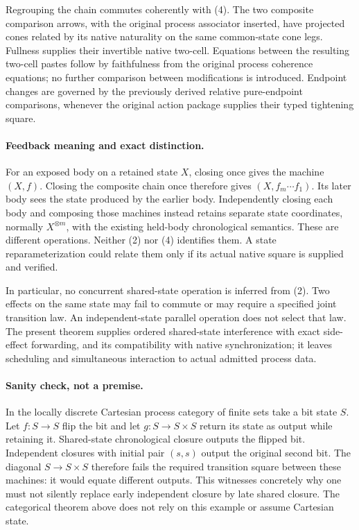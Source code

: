 \documentclass{article}
\begin{document}
Regrouping the chain commutes coherently with (4). The two composite comparison arrows, with the original process associator inserted, have projected cones related by its native naturality on the same common-state cone legs. Fullness supplies their invertible native two-cell. Equations between the resulting two-cell pastes follow by faithfulness from the original process coherence equations; no further comparison between modifications is introduced. Endpoint changes are governed by the previously derived relative pure-endpoint comparisons, whenever the original action package supplies their typed tightening square.

\paragraph{Feedback meaning and exact distinction.} For an exposed body on a retained state $X$, closing once gives the machine $(X,f)$. Closing the composite chain once therefore gives $(X,f_m\cdots f_1)$. Its later body sees the state produced by the earlier body. Independently closing each body and composing those machines instead retains separate state coordinates, normally $X^{\otimes m}$, with the existing held-body chronological semantics. These are different operations. Neither (2) nor (4) identifies them. A state reparameterization could relate them only if its actual native square is supplied and verified.

In particular, no concurrent shared-state operation is inferred from (2). Two effects on the same state may fail to commute or may require a specified joint transition law. An independent-state parallel operation does not select that law. The present theorem supplies ordered shared-state interference with exact side-effect forwarding, and its compatibility with native synchronization; it leaves scheduling and simultaneous interaction to actual admitted process data.

\paragraph{Sanity check, not a premise.} In the locally discrete Cartesian process category of finite sets take a bit state $S$. Let $f:S\to S$ flip the bit and let $g:S\to S\times S$ return its state as output while retaining it. Shared-state chronological closure outputs the flipped bit. Independent closures with initial pair $(s,s)$ output the original second bit. The diagonal $S\to S\times S$ therefore fails the required transition square between these machines: it would equate different outputs. This witnesses concretely why one must not silently replace early independent closure by late shared closure. The categorical theorem above does not rely on this example or assume Cartesian state.
\end{document}

